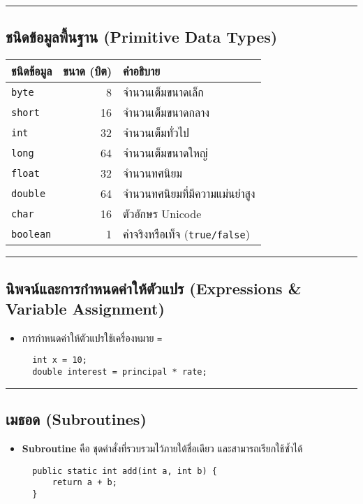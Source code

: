 \documentclass[11pt]{article}
\begin{document}
\noindent\rule{\textwidth}{0.5pt}
\subsection{ชนิดข้อมูลพื้นฐาน (Primitive Data Types)}
\label{sec:org790bc9b}
\begin{center}
\begin{tabular}{lrl}
\textbf{ชนิดข้อมูล} & \textbf{ขนาด (บิต)} & \textbf{คำอธิบาย}\\
\hline
\texttt{byte} & 8 & จำนวนเต็มขนาดเล็ก\\
\texttt{short} & 16 & จำนวนเต็มขนาดกลาง\\
\texttt{int} & 32 & จำนวนเต็มทั่วไป\\
\texttt{long} & 64 & จำนวนเต็มขนาดใหญ่\\
\texttt{float} & 32 & จำนวนทศนิยม\\
\texttt{double} & 64 & จำนวนทศนิยมที่มีความแม่นยำสูง\\
\texttt{char} & 16 & ตัวอักษร Unicode\\
\texttt{boolean} & 1 & ค่าจริงหรือเท็จ (\texttt{true/false})\\
\end{tabular}
\end{center}

\noindent\rule{\textwidth}{0.5pt}
\subsection{นิพจน์และการกำหนดค่าให้ตัวแปร (Expressions \& Variable Assignment)}
\label{sec:org7fa956f}
\begin{itemize}
\item การกำหนดค่าให้ตัวแปรใช้เครื่องหมาย \texttt{=}

\begin{verbatim}
  int x = 10;
  double interest = principal * rate;
\end{verbatim}
\end{itemize}

\noindent\rule{\textwidth}{0.5pt}
\subsection{เมธอด (Subroutines)}
\label{sec:orga5b5ce1}
\begin{itemize}
\item \textbf{Subroutine} คือ ชุดคำสั่งที่รวบรวมไว้ภายใต้ชื่อเดียว และสามารถเรียกใช้ซ้ำได้

\begin{verbatim}
  public static int add(int a, int b) {
      return a + b;
  }
\end{verbatim}
\end{itemize}
\end{document}

